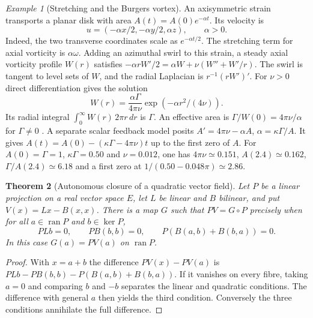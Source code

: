 \documentclass[aps,pra,onecolumn,superscriptaddress,nofootinbib,10pt]{revtex4-2}
\newtheorem{theorem}{Theorem}
\theoremstyle{definition}
\theoremstyle{remark}
\newtheorem{example}[theorem]{Example}
\begin{document}
\begin{example}[Stretching and the Burgers vortex]
\label{ob:stretch}
An axisymmetric strain transports a planar disk with area
$A(t)=A(0)e^{-\alpha t}$. Its velocity is
\[
 u=(-\alpha x/2,-\alpha y/2,\alpha z),\qquad \alpha>0.
\]
Indeed, the two transverse coordinates scale as $e^{-\alpha t/2}$.
The stretching term for axial vorticity is $\alpha\omega$. Adding an
azimuthal swirl to this strain, a steady axial vorticity profile $W(r)$
satisfies
$-\alpha r W'/2=\alpha W+\nu(W''+W'/r)$.
The swirl is tangent to level sets of $W$, and the radial Laplacian
is $r^{-1}(rW')'$. For $\nu>0$ direct differentiation gives the solution
\[
 W(r)=\frac{\alpha\Gamma}{4\pi\nu}\exp(-\alpha r^2/(4\nu)).
\]
Its radial integral $\int_0^\infty W(r)\,2\pi r\,dr$ is $\Gamma$.
An effective area is $\Gamma/W(0)=4\pi\nu/\alpha$ for $\Gamma\ne0$
\cite{obr:Burgers}. A separate scalar feedback model posits
$A'=4\pi\nu-\alpha A$, $\alpha=\kappa\Gamma/A$. It gives
$A(t)=A(0)-(\kappa\Gamma-4\pi\nu)t$ up to the first zero of $A$.
For $A(0)=\Gamma=1$, $\kappa\Gamma=0.50$ and $\nu=0.012$,
one has $4\pi\nu\simeq0.151$, $A(2.4)\simeq0.162$,
$\Gamma/A(2.4)\simeq6.18$ and a first zero at
$1/(0.50-0.048\pi)\simeq2.86$.
\end{example}

\begin{theorem}[Autonomous closure of a quadratic vector field]
\label{ob:quadraticclosure}
Let $P$ be a linear projection on a real vector space $E$, let $L$
be linear and $B$ bilinear, and put $V(x)=Lx-B(x,x)$. There is a map $G$
such that $PV=G\circ P$ precisely when for all $a\in\operatorname{ran}P$
and $b\in\ker P$,
\[
 PLb=0,\qquad PB(b,b)=0,\qquad P(B(a,b)+B(b,a))=0 .
\]
In this case $G(a)=PV(a)$ on $\operatorname{ran}P$.
\end{theorem}
\begin{proof}
With $x=a+b$ the difference $PV(x)-PV(a)$ is
$PLb-PB(b,b)-P(B(a,b)+B(b,a))$. If it vanishes on every fibre, taking $a=0$
and comparing $b$ and $-b$ separates the linear and quadratic conditions.
The difference with general $a$ then yields the third condition.
Conversely the three conditions annihilate the full difference.
\end{proof}
\end{document}
